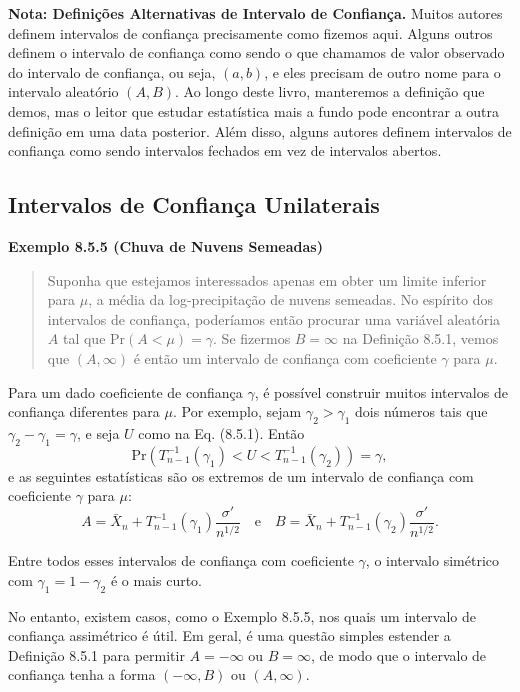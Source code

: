 \noindent\textbf{Nota: Definições Alternativas de Intervalo de Confiança.} Muitos autores definem intervalos de confiança precisamente como fizemos aqui. Alguns outros definem o intervalo de confiança como sendo o que chamamos de valor observado do intervalo de confiança, ou seja, $(a, b)$, e eles precisam de outro nome para o intervalo aleatório $(A, B)$. Ao longo deste livro, manteremos a definição que demos, mas o leitor que estudar estatística mais a fundo pode encontrar a outra definição em uma data posterior. Além disso, alguns autores definem intervalos de confiança como sendo intervalos fechados em vez de intervalos abertos.

\subsection*{Intervalos de Confiança Unilaterais}

\vspace{1em}
\noindent\textbf{Exemplo 8.5.5 (Chuva de Nuvens Semeadas)}
\begin{quote}
    Suponha que estejamos interessados apenas em obter um limite inferior para $\mu$, a média da log-precipitação de nuvens semeadas. No espírito dos intervalos de confiança, poderíamos então procurar uma variável aleatória $A$ tal que $\text{Pr}(A < \mu) = \gamma$. Se fizermos $B = \infty$ na Definição 8.5.1, vemos que $(A, \infty)$ é então um intervalo de confiança com coeficiente $\gamma$ para $\mu$.
\end{quote}
\vspace{1em}

Para um dado coeficiente de confiança $\gamma$, é possível construir muitos intervalos de confiança diferentes para $\mu$. Por exemplo, sejam $\gamma_2 > \gamma_1$ dois números tais que $\gamma_2 - \gamma_1 = \gamma$, e seja $U$ como na Eq. (8.5.1). Então
$$
\text{Pr}(T_{n-1}^{-1}(\gamma_1) < U < T_{n-1}^{-1}(\gamma_2)) = \gamma,
$$
e as seguintes estatísticas são os extremos de um intervalo de confiança com coeficiente $\gamma$ para $\mu$:
$$
A = \bar{X}_n + T_{n-1}^{-1}(\gamma_1) \frac{\sigma'}{n^{1/2}} \quad \text{e} \quad B = \bar{X}_n + T_{n-1}^{-1}(\gamma_2) \frac{\sigma'}{n^{1/2}}.
$$

Entre todos esses intervalos de confiança com coeficiente $\gamma$, o intervalo simétrico com $\gamma_1 = 1 - \gamma_2$ é o mais curto.

No entanto, existem casos, como o Exemplo 8.5.5, nos quais um intervalo de confiança assimétrico é útil. Em geral, é uma questão simples estender a Definição 8.5.1 para permitir $A = -\infty$ ou $B = \infty$, de modo que o intervalo de confiança tenha a forma $(-\infty, B)$ ou $(A, \infty)$.

